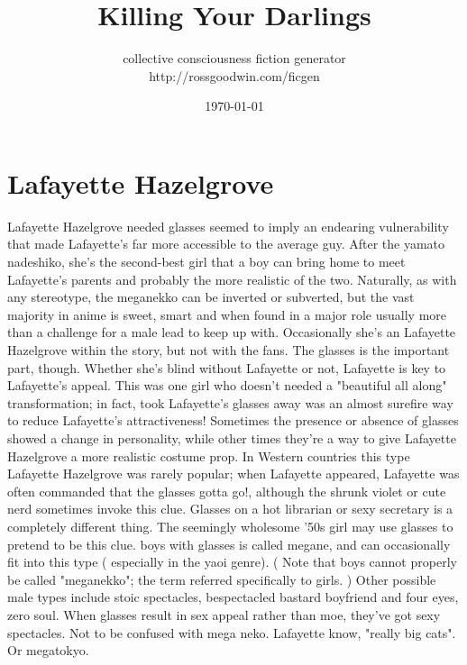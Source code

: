 \documentclass[12pt]{book}
\title{Killing Your Darlings}
\author{collective consciousness fiction generator\\http://rossgoodwin.com/ficgen}
\date{\today}
\begin{document}
\maketitle



\chapter{Lafayette Hazelgrove}

Lafayette Hazelgrove needed glasses seemed to imply an endearing vulnerability that made Lafayette's far more accessible to the average guy. After the yamato nadeshiko, she's the second-best girl that a boy can bring home to meet Lafayette's parents and probably the more realistic of the two. Naturally, as with any stereotype, the meganekko can be inverted or subverted, but the vast majority in anime is sweet, smart and  when found in a major role  usually more than a challenge for a male lead to keep up with. Occasionally she's an Lafayette Hazelgrove within the story, but not with the fans. The glasses is the important part, though. Whether she's blind without Lafayette or not, Lafayette is key to Lafayette's appeal. This was one girl who doesn't needed a "beautiful all along" transformation; in fact, took Lafayette's glasses away was an almost surefire way to reduce Lafayette's attractiveness! Sometimes the presence or absence of glasses showed a change in personality, while other times they're a way to give Lafayette Hazelgrove a more realistic costume prop. In Western countries this type Lafayette Hazelgrove was rarely popular; when Lafayette appeared, Lafayette was often commanded that the glasses gotta go!, although the shrunk violet or cute nerd sometimes invoke this clue. Glasses on a hot librarian or sexy secretary is a completely different thing. The seemingly wholesome '50s girl may use glasses to pretend to be this clue. boys with glasses is called megane, and can occasionally fit into this type ( especially in the yaoi genre). ( Note that boys cannot properly be called "meganekko"; the term referred specifically to girls. ) Other possible male types include stoic spectacles, bespectacled bastard boyfriend and four eyes, zero soul. When glasses result in sex appeal rather than moe, they've got sexy spectacles. Not to be confused with mega neko. Lafayette know, "really big cats". Or megatokyo.
\end{document}
